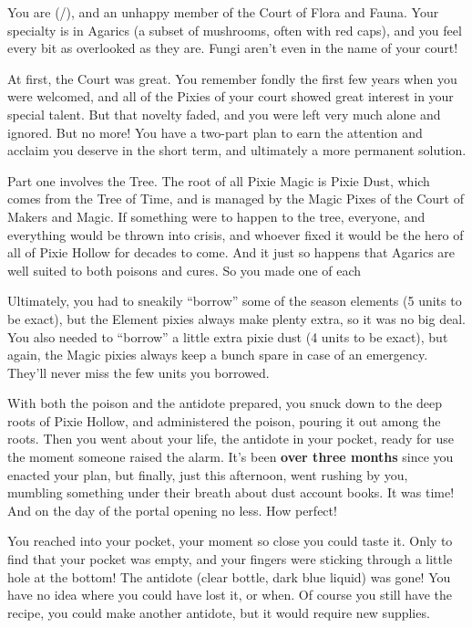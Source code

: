 \documentclass[char]{PP}
\begin{document}
\name{\cFWanabe{}}

You are \cFWanabe{} (\cFWanabe{\They}/\cFWanabe{\Them}), and an unhappy member of the Court of Flora and Fauna. Your specialty is in Agarics (a subset of mushrooms, often with red caps), and you feel every bit as overlooked as they are. Fungi aren’t even in the name of your court!

At first, the Court was great. You remember fondly the first few years when you were welcomed, and all of the Pixies of your court showed great interest in your special talent. But that novelty faded, and you were left very much alone and ignored. But no more! You have a two-part plan to earn the attention and acclaim you deserve in the short term, and ultimately a more permanent solution.

Part one involves the Tree. The root of all Pixie Magic is Pixie Dust, which comes from the Tree of Time, and is managed by the Magic Pixes of the Court of Makers and Magic. If something were to happen to the tree, everyone, and everything would be thrown into crisis, and whoever fixed it would be the hero of all of Pixie Hollow for decades to come. And it just so happens that Agarics are well suited to both poisons and cures. So you made one of each

Ultimately, you had to sneakily “borrow” some of the season elements (5 units to be exact), but the Element pixies always make plenty extra, so it was no big deal. You also needed to “borrow” a little extra pixie dust (4 units to be exact), but again, the Magic pixies always keep a bunch spare in case of an emergency. They’ll never miss the few units you borrowed.

With both the poison and the antidote prepared, you snuck down to the deep roots of Pixie Hollow, and administered the poison, pouring it out among the roots. Then you went about your life, the antidote in your pocket, ready for use the moment someone raised the alarm. It’s been \textbf{over three months} since you enacted your plan, but finally, just this afternoon, \cMTree{} went rushing by you, mumbling something under their breath about dust account books. It was time! And on the day of the portal opening no less. How perfect!

You reached into your pocket, your moment so close you could taste it. Only to find that your pocket was empty, and your fingers were sticking through a little hole at the bottom! The antidote (clear bottle, dark blue liquid) was gone! You have no idea where you could have lost it, or when. Of course you still have the recipe, you could make another antidote, but it would require new supplies. 
\end{document}

